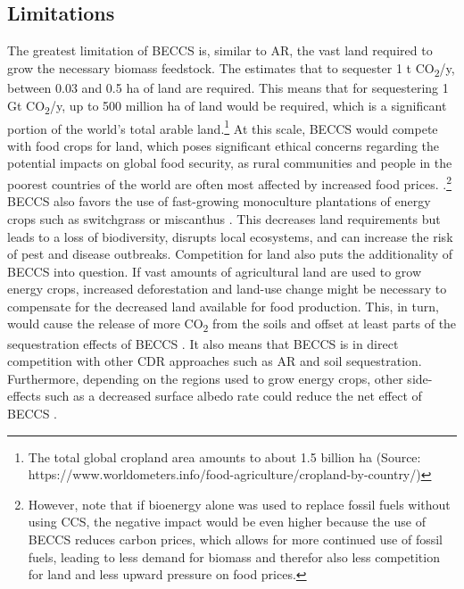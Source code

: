 \subsection*{Limitations}
The greatest limitation of BECCS is, similar to AR, the vast land required to grow the necessary biomass feedstock. The \textcite{IPCC2018Global1.5C} estimates that to sequester 1 t CO\textsubscript{2}/y, between 0.03 and 0.5 ha of land are required. This means that for sequestering 1 Gt CO\textsubscript{2}/y, up to 500 million ha of land would be required, which is a significant portion of the world's total arable land.\footnote{The total global cropland area amounts to about 1.5 billion ha (Source: https://www.worldometers.info/food-agriculture/cropland-by-country/)} At this scale, BECCS would compete with food crops for land, which poses significant ethical concerns regarding the potential impacts on global food security, as rural communities and people in the poorest countries of the world are often most affected by increased food prices. \parencite{Anderson2017TheBECCS, Hanssen2020TheStorage}.\footnote{However, \textcite{Muratori2016GlobalBECCS} note that if bioenergy alone was used to replace fossil fuels without using CCS, the negative impact would be even higher because the use of BECCS reduces carbon prices, which allows for more continued use of fossil fuels, leading to less demand for biomass and therefor also less competition for land and less upward pressure on food prices.}
BECCS also favors the use of fast-growing monoculture plantations of energy crops such as switchgrass or miscanthus \parencite{Fajardy2017CanEmissions}. This decreases land requirements but leads to a loss of biodiversity, disrupts local ecosystems, and can increase the risk of pest and disease outbreaks.
Competition for land also puts the additionality of BECCS into question. If vast amounts of agricultural land are used to grow energy crops, increased deforestation and land-use change might be necessary to compensate for the decreased land available for food production. This, in turn, would cause the release of more CO\textsubscript{2} from the soils and offset at least parts of the sequestration effects of BECCS \parencite{ChathamHouse2020ReachingWork, Muratori2016GlobalBECCS}. It also means that BECCS is in direct competition with other CDR approaches such as AR and soil sequestration.
Furthermore, depending on the regions used to grow energy crops, other side-effects such as a decreased surface albedo rate could reduce the net effect of BECCS \parencite{Hanssen2020TheStorage}.
